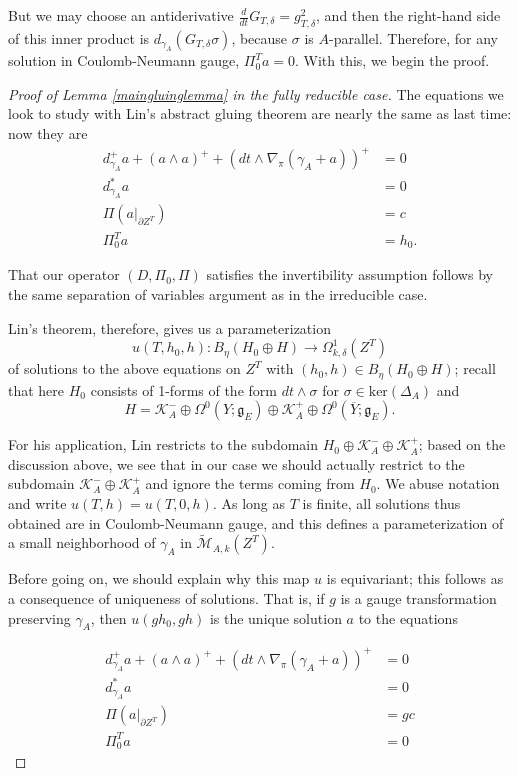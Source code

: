 \documentclass[10pt,a4paper]{amsart}
\theoremstyle{definition}
\theoremstyle{remark}
\numberwithin{figure}{qchap}
\begin{document}
But we may choose an antiderivative $\frac{d}{dt} G_{T,\delta} = g_{T,\delta}^2$, and then the right-hand side of this inner product is $d_{\gamma_A} (G_{T,\delta} \sigma)$, because $\sigma$ is $A$-parallel. Therefore, for any solution in Coulomb-Neumann gauge, $\Pi^T_0 a = 0$. With this, we begin the proof.

\begin{proof}[Proof of Lemma \ref{maingluinglemma} in the fully reducible case]The equations we look to study with Lin's abstract gluing theorem are nearly the same as last time: now they are 
\begin{align*}d_{\gamma_A}^+ a + (a \wedge a)^+ + \left(dt \wedge \nabla_\pi(\gamma_A + a)\right)^+ &= 0 \\
d_{\gamma_A}^* a &= 0 \\
\Pi (a \big|_{\partial Z^T}) &= c\\
\Pi_0^T a &= h_0.
\end{align*}

That our operator $(D, \Pi_0, \Pi)$ satisfies the invertibility assumption follows by the same separation of variables argument as in the irreducible case.

Lin's theorem, therefore, gives us a parameterization 
$$u(T, h_0, h): B_\eta(H_0 \oplus H) \to \Omega^1_{k,\delta}(Z^T)$$ 
of solutions to the above equations on $Z^T$ with $(h_0, h) \in B_\eta(H_0 \oplus H)$; recall that here $H_0$ consists of 1-forms of the form $dt \wedge \sigma$ for $\sigma \in \text{ker}(\Delta_A)$ and $$H = \mathcal K_A^- \oplus \Omega^0(Y; \mathfrak g_E) \oplus \mathcal K_A^+ \oplus \Omega^0(\overline Y; \mathfrak g_E).$$

For his application, Lin restricts to the subdomain $H_0 \oplus \mathcal K_A^- \oplus \mathcal K_A^+$; based on the discussion above, we see that in our case we should actually restrict to the subdomain $\mathcal K_A^- \oplus \mathcal K_A^+$ and ignore the terms coming from $H_0$. We abuse notation and write $u(T, h) = u(T, 0, h)$. As long as $T$ is finite, all solutions thus obtained are in Coulomb-Neumann gauge, and this defines a parameterization of a small neighborhood of $\gamma_A$ in $\widetilde{\mathcal M}_{A,k}(Z^T)$.

Before going on, we should explain why this map $u$ is equivariant; this follows as a consequence of uniqueness of solutions. That is, if $g$ is a gauge transformation preserving $\gamma_A$, then $u(gh_0, gh)$ is the unique solution $a$ to the equations

\begin{align*}d_{\gamma_A}^+ a + (a \wedge a)^+ + \left(dt \wedge \nabla_\pi(\gamma_A + a)\right)^+ &= 0 \\
d_{\gamma_A}^* a &= 0 \\
\Pi (a \big|_{\partial Z^T}) &= gc\\
\Pi_0^T a &= 0
\end{align*}


\end{proof}
\end{document}
